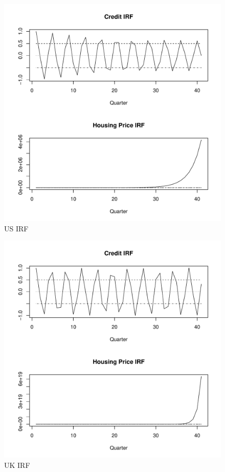 \documentclass[fleqn]{article}
\begin{document}
\begin{outline}[enumerate]
\begin{figure}[h!]
	\caption{US IRF}	
	\centerline{\includegraphics[scale=0.7]{../Output/Graphs/IRF_US.pdf}}
\end{figure}

\begin{figure}[h!]
	\caption{UK IRF}	
	\centerline{\includegraphics[scale=0.7]{../Output/Graphs/IRF_GB.pdf}}
\end{figure}


\end{outline}
\end{document}
